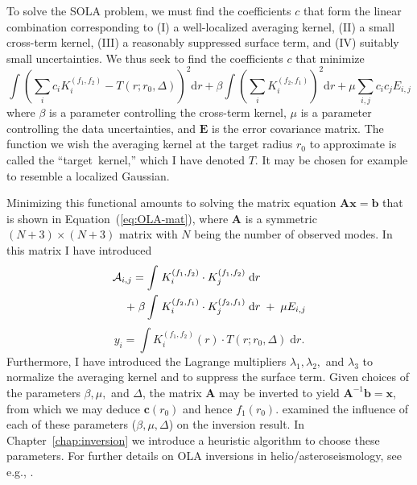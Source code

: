 To solve the SOLA problem, we must find the coefficients $c$ that form the linear combination corresponding to (I) a well-localized averaging kernel, (II) a small cross-term kernel, (III) a reasonably suppressed surface term, and (IV) suitably small uncertainties. 
We thus seek to find the coefficients $c$ that minimize
\begin{equation}
    \int\left(
        \sum_i c_i K_i^{(f_1,f_2)} - T(r; r_0, \Delta)
    \right)^2
    \text{d}r
    +
    \beta \int\left(
        \sum_i K_i^{(f_2,f_1)}
    \right)^2
    \text{d}r
    +
    \mu \sum_{i,j} c_i c_j E_{i,j}
\end{equation}
where $\beta$ is a parameter controlling the cross-term kernel, $\mu$ is a parameter controlling the data uncertainties, and $\mathbf{E}$ is the error covariance matrix.
The function we wish the averaging kernel at the target radius $r_0$ to approximate is called the ``target~kernel,'' which I have denoted $T$. 
It may be chosen for example to resemble a localized Gaussian. 

Minimizing this functional amounts to solving the matrix equation ${\mathbf{A}\mathbf{x} = \mathbf{b}}$ that is shown in Equation~(\ref{eq:OLA-mat}), where $\mathbf{A}$ is a symmetric ${(N+3)\times (N+3)}$ matrix with $N$ being the number of observed modes. %
In this matrix I have introduced
\begin{align}
    \mathcal{A}_{i,j} 
    = 
    \int &\; K_i^{(f_1, f_2)} \cdot K_j^{(f_1, f_2)} %
    \; \text{d}r 
    \notag\\\;+\;\beta \int &\; K_i^{(f_2, f_1)} \cdot K_j^{(f_2, f_1)} \; \text{d}r 
    \; + \; \mu E_{i,j}
\end{align}
\begin{equation}
        y_i%
        = 
        \int K_i^{(f_1, f_2)}(r) \cdot T(r; r_0, \Delta) \; \text{d}r. 
\end{equation}
Furthermore, I have introduced the Lagrange multipliers $\lambda_1, \lambda_2,$ and $\lambda_3$ to normalize the averaging kernel and to suppress the surface term. 
Given choices of the parameters $\beta, \mu,$ and $\Delta$, the matrix $\mathbf{A}$ may be inverted %
to yield ${\mathbf{A}^{-1}\mathbf{b}=\mathbf{x}}$, from which we may deduce ${\mathbf c(r_0)}$ and hence ${f_1(r_0)}$. 
\citet{1998esasp.418..505r,1999MNRAS.309...35R} examined the influence of each of these parameters ($\beta, \mu, \Delta$) on the inversion result. 
In Chapter~\ref{chap:inversion} we introduce a heuristic algorithm to choose these parameters. 
For further details on OLA inversions in helio/asteroseismology, see e.g., \citet{basuchaplin2017}. 


